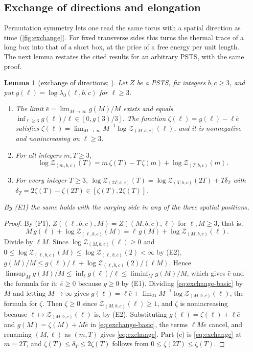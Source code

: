 \documentclass[11pt,a4paper]{amsart}
\newtheorem{lemma}[theorem]{Lemma}
\theoremstyle{definition}
\theoremstyle{remark}
\numberwithin{equation}{section}
\newcommand{\PSTS}{\textup{PSTS}}          %
\newcommand{\TT}{\mathbb{T}}               %
\newcommand{\Zc}{\mathcal{Z}}              %
\newcommand{\Zs}[2]{\Zc_{#1}(#2)}          %
\newcommand{\lzero}{\lambda_0}             %
\begin{document}
\subsection{Exchange of directions and elongation}

Permutation symmetry lets one read the same torus with a spatial direction as time (\cref{fig:exchange}). For fixed transverse sides this turns the thermal trace of a long box into that of a short box, at the price of a free energy per unit length. The next lemma restates the cited results for an arbitrary \PSTS{}, with the same proof.

\begin{lemma}[{exchange of directions; \cite[Lemma~24(i) and Proposition~21(i)]{bhattacharjee2026first}}]\label{lem:exchange}
Let $Z$ be a \PSTS{}, fix integers $b,c\ge3$, and put $g(\ell)=\log\lzero(\ell,b,c)$ for $\ell\ge3$.
\begin{enumerate}[label=(\alph*)]
\item The limit $\bar e=\lim_{M\to\infty}g(M)/M$ exists and equals $\inf_{\ell\ge3}g(\ell)/\ell\in[0,g(3)/3]$. The function $\zeta(\ell)=g(\ell)-\ell\bar e$ satisfies $\zeta(\ell)=\lim_{M\to\infty}M^{-1}\log\Zs{(M,b,c)}{\ell}$, and it is nonnegative and nonincreasing on $\ell\ge3$.
\item For all integers $m,T\ge3$,
\begin{equation}\label{eq:exchange}
\log\Zs{(m,b,c)}{T}=m\,\zeta(T)-T\,\zeta(m)+\log\Zs{(T,b,c)}{m}.
\end{equation}
\item For every integer $T\ge3$, $\log\Zs{(2T,b,c)}{T}=\log\Zs{(T,b,c)}{2T}+T\delta_T$ with $\delta_T=2\zeta(T)-\zeta(2T)\in[\zeta(T),2\zeta(T)]$.
\end{enumerate}
By (E1) the same holds with the varying side in any of the three spatial positions.
\end{lemma}

\begin{proof}
By (P1), $Z((\ell,b,c),M)=Z((M,b,c),\ell)$ for $\ell,M\ge3$, that is,
\begin{equation}\label{eq:exchange-basic}
M\,g(\ell)+\log\Zs{(\ell,b,c)}{M}=\ell\,g(M)+\log\Zs{(M,b,c)}{\ell}.
\end{equation}
Divide by $\ell M$. Since $\log\Zs{(M,b,c)}{\ell}\ge0$ and $0\le\log\Zs{(\ell,b,c)}{M}\le\log\Zs{(\ell,b,c)}{2}<\infty$ by (E2), $g(M)/M\le g(\ell)/\ell+\log\Zs{(\ell,b,c)}{2}/(\ell M)$. Hence $\limsup_Mg(M)/M\le\inf_\ell g(\ell)/\ell\le\liminf_Mg(M)/M$, which gives $\bar e$ and the formula for it; $\bar e\ge0$ because $g\ge0$ by (E1). Dividing \eqref{eq:exchange-basic} by $M$ and letting $M\to\infty$ gives $g(\ell)=\ell\bar e+\lim_MM^{-1}\log\Zs{(M,b,c)}{\ell}$, the formula for $\zeta$. Then $\zeta\ge0$ since $\Zs{(M,b,c)}{\ell}\ge1$, and $\zeta$ is nonincreasing because $\ell\mapsto\Zs{(M,b,c)}{\ell}$ is, by (E2). Substituting $g(\ell)=\zeta(\ell)+\ell\bar e$ and $g(M)=\zeta(M)+M\bar e$ in \eqref{eq:exchange-basic}, the terms $\ell M\bar e$ cancel, and renaming $(M,\ell)$ as $(m,T)$ gives \eqref{eq:exchange}. Part (c) is \eqref{eq:exchange} at $m=2T$, and $\zeta(T)\le\delta_T\le2\zeta(T)$ follows from $0\le\zeta(2T)\le\zeta(T)$.
\end{proof}
\end{document}
